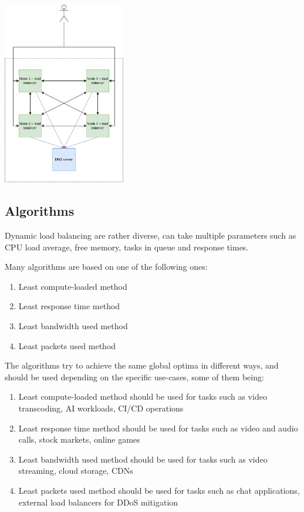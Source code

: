 \documentclass[conference]{IEEEtran}
\begin{document}
    \begin{center}
        \vspace{1em}
        \includegraphics[width=0.4\textwidth]{decentralised-load-balanced-system.png}
         \label{decentralised-load-balanced-system}
        \vspace{1em}
    \end{center}

\subsection{Algorithms}
    Dynamic load balancing are rather diverse, can take multiple parameters such as CPU load average, free memory, tasks in
queue and response times.

    Many algorithms are based on one of the following ones:

    \begin{enumerate}
        \item Least compute-loaded method
        \item Least response time method
        \item Least bandwidth used method
        \item Least packets used method
    \end{enumerate}

    The algorithms try to achieve the same global optima in different ways, and should be used depending on the specific
use-cases, some of them being:

    \begin{enumerate}
        \item Least compute-loaded method should be used for tasks such as video transcoding, AI workloads, CI/CD operations
        \item Least response time method should be used for tasks such as video and audio calls, stock markets, online games
        \item Least bandwidth used method should be used for tasks such as video streaming, cloud storage, CDNs
        \item Least packets used method should be used for tasks such as chat applications, external load balancers for DDoS mitigation
    \end{enumerate}
\end{document}

